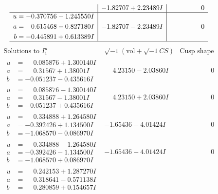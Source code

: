 \documentclass[1p]{elsarticle_modified}
\theoremstyle{definition}
\newcommand{\I}{\sqrt{-1}}
\begin{document}
$$\begin{array}{c|c|c}
 & -1.82707 + 2.23489 I & \phantom{-0.000000 } 0 \\ \hline\begin{aligned}
u &= -0.370756 - 1.245550 I \\
a &= \phantom{-}0.615468 - 0.827180 I \\
b &= -0.445891 + 0.613389 I\end{aligned}
 & -1.82707 - 2.23489 I & \phantom{-0.000000 } 0\\
 \hline 
 \end{array}$$\newpage$$\begin{array}{c|c|c}  
\text{Solutions to }I^u_{1}& \I (\text{vol} + \sqrt{-1}CS) & \text{Cusp shape}\\
 \hline 
\begin{aligned}
u &= \phantom{-}0.085876 + 1.300140 I \\
a &= \phantom{-}0.31567 + 1.38001 I \\
b &= -0.051237 - 0.435616 I\end{aligned}
 & \phantom{-}4.23150 - 2.03860 I & \phantom{-0.000000 } 0 \\ \hline\begin{aligned}
u &= \phantom{-}0.085876 - 1.300140 I \\
a &= \phantom{-}0.31567 - 1.38001 I \\
b &= -0.051237 + 0.435616 I\end{aligned}
 & \phantom{-}4.23150 + 2.03860 I & \phantom{-0.000000 } 0 \\ \hline\begin{aligned}
u &= \phantom{-}0.334888 + 1.264580 I \\
a &= -0.392426 + 1.134500 I \\
b &= -1.068570 - 0.086970 I\end{aligned}
 & -1.65436 - 4.01424 I & \phantom{-0.000000 } 0 \\ \hline\begin{aligned}
u &= \phantom{-}0.334888 - 1.264580 I \\
a &= -0.392426 - 1.134500 I \\
b &= -1.068570 + 0.086970 I\end{aligned}
 & -1.65436 + 4.01424 I & \phantom{-0.000000 } 0 \\ \hline\begin{aligned}
u &= \phantom{-}0.242153 + 1.287270 I \\
a &= \phantom{-}0.318641 - 0.571138 I \\
b &= \phantom{-}0.280859 + 0.154657 I\end{aligned}

\end{array}$$
\end{document}
